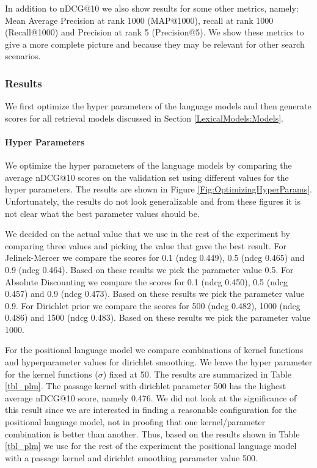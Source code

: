 In addition to nDCG@10 we also show results for some other metrics,
namely: Mean Average Precision at rank 1000 (MAP@1000), 
recall at rank 1000 (Recall@1000) and Precision at rank 5 (Precision@5).
We show these metrics to give a more complete picture and because they
may be relevant for other search scenarios.


\subsubsection{Results}
\label{ResultsLexicalModels}

We first optimize the hyper parameters of the 
language models and then generate scores for
all retrieval models discussed in 
Section \ref{LexicalModels:Models}.

\paragraph{Hyper Parameters}

We optimize the hyper parameters of the language models
by comparing the average nDCG@10 scores on the validation set 
using different values for the hyper parameters.
The results are shown in Figure \ref{Fig:OptimizingHyperParams}.
Unfortunately, the results do not look generalizable and 
from these figures it is not clear what 
the best parameter values should be. 



We decided on the actual value that we use in the rest of the experiment
by comparing three values and picking the value that gave the best result.
%
For Jelinek-Mercer we compare the scores for 0.1 (ndcg 0.449),
0.5 (ndcg 0.465) and 0.9 (ndcg 0.464). Based on these results we pick
the parameter value 0.5. 
%
For Absolute Discounting we compare the scores for 0.1 (ndcg 0.450),
0.5 (ndcg 0.457) and 0.9 (ndcg 0.473). Based on these results we pick
the parameter value 0.9. 
%
For Dirichlet prior we compare the scores for 500 (ndcg 0.482),
1000 (ndcg 0.486) and 1500 (ndcg 0.483). Based on these results we pick
the parameter value 1000. 




For the positional language model we compare combinations of
kernel functions and hyperparameter values for dirichlet smoothing.
We leave the hyper parameter for the kernel functions ($\sigma$) fixed at 50.
The results are summarized in Table \ref{tbl_plm}.
The passage kernel with dirichlet parameter 500 has the highest
average nDCG@10 score, namely 0.476. We did not look at the
significance of this result since we are interested
in finding a reasonable configuration for the positional language model, not in proofing that one kernel/parameter combination is better than another.
Thus, based on the results shown in Table \ref{tbl_plm}  we use for the rest of the experiment the positional language model with a passage kernel and dirichlet smoothing parameter value 500.

